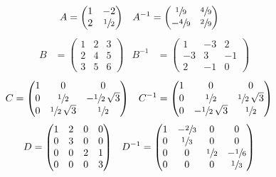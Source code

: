 \documentclass[12pt,french,oneside,a4paper]{memoir} %
\begin{document}
\begin{exo}
\begin{correction}
  \begin{align*}
    A &=  \begin{pmatrix}
      1 & -2 \\
      2 & \sfrac{1}{2}
    \end{pmatrix}
&
    A^{-1} &= \begin{pmatrix}
      \sfrac{1}{9} & \sfrac{4}{9} \\
      -\sfrac{4}{9} & \sfrac{2}{9}
    \end{pmatrix}
\end{align*}
\begin{align*}
    B &= 
    \begin{pmatrix}
      1 & 2 & 3 \\
      2 & 4 & 5 \\
      3 & 5 & 6
    \end{pmatrix}
&
    B^{-1} &= \begin{pmatrix}
      1 & -3 & 2 \\
      -3 & 3 & -1 \\
      2 & -1 & 0
    \end{pmatrix}
\end{align*}
\begin{align*}
    C &= \begin{pmatrix}
      1 & 0 & 0 \\
      0 & \sfrac{1}{2} & -\sfrac{1}{2} \, \sqrt{3} \\
      0 & \sfrac{1}{2} \, \sqrt{3} & \sfrac{1}{2}
    \end{pmatrix}
&
    C^{-1} &= \begin{pmatrix}
      1 & 0 & 0 \\
      0 & \sfrac{1}{2} & \sfrac{1}{2} \, \sqrt{3} \\
      0 & -\sfrac{1}{2} \, \sqrt{3} & \sfrac{1}{2}
    \end{pmatrix}
\end{align*}
\begin{align*}
    D &= \begin{pmatrix}
      1 & 2 & 0 & 0 \\
      0 & 3 & 0 & 0 \\
      0 & 0 & 2 & 1 \\
      0 & 0 & 0 & 3
    \end{pmatrix}
&
    D^{-1} &= 
    \begin{pmatrix}
      1 & -\sfrac{2}{3} & 0 & 0 \\
      0 & \sfrac{1}{3} & 0 & 0 \\
      0 & 0 & \sfrac{1}{2} & -\sfrac{1}{6} \\
      0 & 0 & 0 & \sfrac{1}{3}
    \end{pmatrix}
  \end{align*}
\end{correction}
\end{exo}
\end{document}
